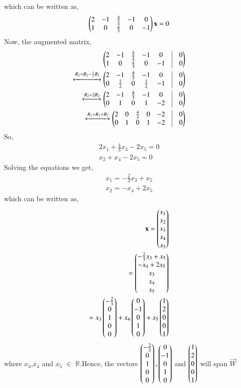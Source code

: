 \documentclass[journal,12pt,twocolumn]{IEEEtran}
\begin{document}
   which can be written as,
   \begin{align}
  \begin{pmatrix}2&-1&\frac{4}{3}&-1&0\\1&0&\frac{2}{3}&0&-1\end{pmatrix}\mathbf{x}=0
   \end{align}
   Now, the augmented matrix,
   \begin{align}
     \myvec{2&-1&\frac{4}{3}&-1&0&\vrule&0\\1&0&\frac{2}{3}&0&-1&\vrule& 0}\\
     \xleftrightarrow{R_2=R_2-\frac{1}{2}R_1}\myvec{2&-1&\frac{4}{3}&-1&0&\vrule&0\\0&\frac{1}{2}&0&\frac{1}{2}&-1&\vrule& 0}\\
      \xleftrightarrow{R_2=2R_2}\myvec{2&-1&\frac{4}{3}&-1&0&\vrule&0\\0&1&0&1&-2&\vrule& 0}\\
      \xleftrightarrow{R_1=R_1+R_2}\myvec{2&0&\frac{4}{3}&0&-2&\vrule&0\\0&1&0&1&-2&\vrule& 0}
\end{align}
So,
\begin{align}
2x_1+\frac{4}{3}x_3-2x_5=0\\
x_2+x_4-2x_5=0
\end{align}
Solving the equations we get,
\begin{align}
x_1=-\frac{2}{3}x_3+x_5\\
x_2=-x_4+2x_5
\end{align}
which can be written as,
   \begin{align}
   \mathbf{x} = \begin{pmatrix}x_1\\x_2\\x_3 \\ x_4 \\ x_5\end{pmatrix} \\= \begin{pmatrix}-\frac{2}{3}x_3+x_5\\-x_4+2x_5\\x_3 \\ x_4 \\ x_5\end{pmatrix}\\=x_3\begin{pmatrix}-\frac{2}{3}\\0\\1\\0\\0\end{pmatrix} +x_4\begin{pmatrix}0\\-1\\0\\1\\0\end{pmatrix}+x_5\begin{pmatrix}1\\2\\0\\0\\1\end{pmatrix}
\end{align}
where $x_3$,$x_4$ and $x_5$ $\in$ $\mathbb{R}$.Hence, the vectors $\begin{pmatrix}-\frac{2}{3}\\0\\1\\0\\0\end{pmatrix},\begin{pmatrix}0\\-1\\0\\1\\0\end{pmatrix}$ and $\begin{pmatrix}1\\2\\0\\0\\1\end{pmatrix}$ will span $\vec{W}$
\end{document}
